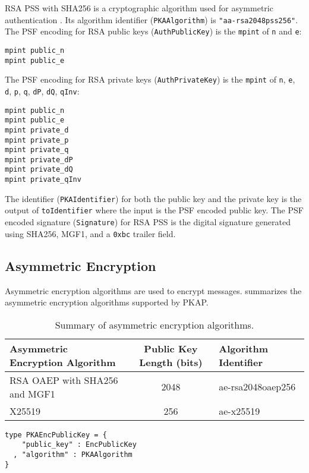 \documentclass{article}
\newcommand{\pkap}{PKAP}
\begin{document}
RSA PSS with SHA256 is a cryptographic algorithm used for asymmetric authentication \cite{rfc3447}. 
Its algorithm identifier (\texttt{PKAAlgorithm}) is \texttt{"aa-rsa2048pss256"}. 
The PSF encoding for RSA public keys (\texttt{AuthPublicKey}) is the \texttt{mpint} of \texttt{n} and \texttt{e}:
\begin{lstlisting}
mpint public_n
mpint public_e
\end{lstlisting}
The PSF encoding for RSA private keys (\texttt{AuthPrivateKey}) is the \texttt{mpint} of \texttt{n}, \texttt{e}, \texttt{d}, \texttt{p}, \texttt{q}, \texttt{dP}, \texttt{dQ}, \texttt{qInv}: 
\begin{lstlisting}
mpint public_n
mpint public_e
mpint private_d
mpint private_p
mpint private_q
mpint private_dP
mpint private_dQ
mpint private_qInv
\end{lstlisting}
The identifier (\texttt{PKAIdentifier}) for both the public key and the private key is the output of \texttt{toIdentifier} where the input is the PSF encoded public key. 
The PSF encoded signature (\texttt{Signature}) for RSA PSS is the digital signature generated using SHA256, MGF1, and a \texttt{0xbc} trailer field.

\subsection{Asymmetric Encryption}

Asymmetric encryption algorithms are used to encrypt messages. 
 summarizes the asymmetric encryption algorithms supported by \pkap{}. 


\begin{table}
\begin{center}
\begin{tabular}{| l | c | l |}
\hline
Asymmetric Encryption Algorithm & Public Key Length (bits) & Algorithm Identifier \\ 
\hline
RSA OAEP with SHA256 and MGF1 & 2048 & ae-rsa2048oaep256 \\
X25519 & 256  & ae-x25519 \\
\hline
\end{tabular}
\caption{Summary of asymmetric encryption algorithms.}
\label{tabel:asymmetric_enc_alg}
\end{center}
\end{table}

\begin{lstlisting}
type PKAEncPublicKey = {
    "public_key" : EncPublicKey
  , "algorithm" : PKAAlgorithm
}
\end{lstlisting}
\end{document}
